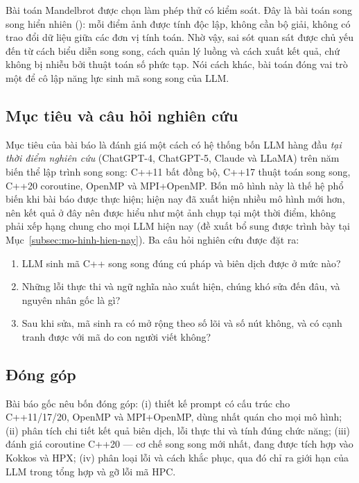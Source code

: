 Bài toán Mandelbrot được chọn làm phép thử có kiểm soát. Đây là bài toán song
song hiển nhiên (): mỗi điểm ảnh được tính độc lập,
không cần bộ giải, không có trao đổi dữ liệu giữa các đơn vị tính toán. Nhờ vậy,
sai sót quan sát được chủ yếu đến từ cách biểu diễn song song, cách quản lý luồng
và cách xuất kết quả, chứ không bị nhiễu bởi thuật toán số phức tạp. Nói cách
khác, bài toán đóng vai trò một  để cô lập năng lực sinh
mã song song của LLM.

\subsection{Mục tiêu và câu hỏi nghiên cứu}

Mục tiêu của bài báo là đánh giá một cách có hệ thống bốn LLM hàng đầu
\emph{tại thời điểm nghiên cứu} (ChatGPT-4, ChatGPT-5, Claude và LLaMA)
trên năm biến thể lập trình song song:
C++11 bất đồng bộ, C++17 thuật toán song song, C++20 coroutine, OpenMP và
MPI+OpenMP. Bốn mô hình này là thế hệ phổ biến khi bài báo được thực hiện; hiện
nay đã xuất hiện nhiều mô hình mới hơn, nên kết quả ở đây nên được hiểu như một
ảnh chụp tại một thời điểm, không phải xếp hạng chung cho mọi LLM hiện nay
(đề xuất bổ sung được trình bày tại Mục~\ref{subsec:mo-hinh-hien-nay}).
Ba câu hỏi nghiên cứu được đặt ra:

\begin{enumerate}[label=\textbf{RQ\arabic*.},leftmargin=2.2cm]
  \item LLM sinh mã C++ song song đúng cú pháp và biên dịch được ở mức nào?
  \item Những lỗi thực thi và ngữ nghĩa nào xuất hiện, chúng khó sửa đến đâu, và
        nguyên nhân gốc là gì?
  \item Sau khi sửa, mã sinh ra có mở rộng theo số lõi và số nút không, và có
        cạnh tranh được với mã do con người viết không?
\end{enumerate}

\subsection{Đóng góp}

Bài báo gốc nêu bốn đóng góp: (i) thiết kế prompt có cấu trúc cho C++11/17/20,
OpenMP và MPI+OpenMP, dùng nhất quán cho mọi mô hình; (ii) phân tích chi tiết kết
quả biên dịch, lỗi thực thi và tính đúng chức năng; (iii) đánh giá coroutine
C++20 — cơ chế song song mới nhất, đang được tích hợp vào Kokkos và HPX; (iv)
phân loại lỗi và cách khắc phục, qua đó chỉ ra giới hạn của LLM trong tổng hợp và
gỡ lỗi mã HPC.

